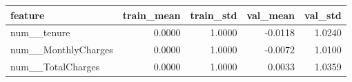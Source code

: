 \begin{tabular}{lrrrr}
\toprule
feature & train\_mean & train\_std & val\_mean & val\_std \\
\midrule
num\_\_tenure & 0.0000 & 1.0000 & -0.0118 & 1.0240 \\
num\_\_MonthlyCharges & 0.0000 & 1.0000 & -0.0072 & 1.0100 \\
num\_\_TotalCharges & 0.0000 & 1.0000 & 0.0033 & 1.0359 \\
\bottomrule
\end{tabular}

